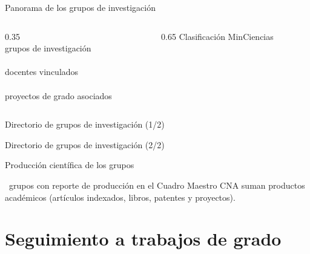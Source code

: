 \documentclass[aspectratio=169, 11pt]{beamer}
\begin{document}
\begin{frame}{Panorama de los grupos de investigación}
  \begin{columns}[T]
    \begin{column}{0.35\textwidth}
      \centering
      {\Huge \textbf{\color{udBlue}\NumGrupos}}\\ \small grupos de investigación\\[0.4cm]
      {\Huge \textbf{\color{clrorange}\NumDocentesGrupos}}\\ \small docentes vinculados\\[0.4cm]
      {\Huge \textbf{\color{clraqua}\NumProyectosConGrupo}}\\ \small proyectos de grado asociados
    \end{column}
    \begin{column}{0.65\textwidth}
      \centering \footnotesize Clasificación MinCiencias
      \resizebox{\linewidth}{!}{\ChartGruposClasificacion}
    \end{column}
  \end{columns}
\end{frame}

\begin{frame}{Directorio de grupos de investigación (1/2)}
  \centering \tiny
  \TablaGruposUno
\end{frame}

\begin{frame}{Directorio de grupos de investigación (2/2)}
  \centering \tiny
  \TablaGruposDos
\end{frame}

\begin{frame}{Producción científica de los grupos}
  \centering
  \resizebox{0.85\linewidth}{!}{\ChartProduccionGrupos}
  \par
  \vspace{0.2cm}
  \small \NumGruposProduccion\ grupos con reporte de producción en el Cuadro Maestro CNA suman \textbf{\TotalProductosGrupos} productos académicos (artículos indexados, libros, patentes y proyectos).
\end{frame}

\section{Seguimiento a trabajos de grado}
\end{document}
